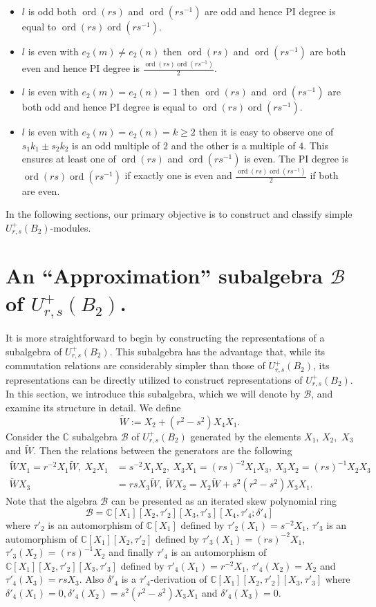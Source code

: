 \documentclass[12 pt,reqno]{amsart}
\numberwithin{equation}{section}
\newcommand{\C}{\mathbb{C}}
\newcommand{\B}{\mathcal{B}}
\DeclareMathOperator{\ord}{ord}
\theoremstyle{definition}
\theoremstyle{definition}
\theoremstyle{remark}
\theoremstyle{remark}
\begin{document}
    \begin{itemize}
        \item $l$ is odd both $\ord(rs)$ and $\ord(rs^{-1})$ are odd and hence PI degree is equal to $\ord(rs)\ord(rs^{-1})$.
        \item  $l$ is even with $e_2(m)\neq e_2(n)$ then $\ord(rs)$ and $\ord(rs^{-1})$ are both even and hence PI degree is $\displaystyle\frac{\ord(rs)\ord(rs^{-1})}{2}$.
        \item $l$ is even with $e_2(m)= e_2(n)=1$ then $\ord(rs)$ and $\ord(rs^{-1})$ are both odd and hence PI degree is equal to $\ord(rs)\ord(rs^{-1})$.
        \item $l$ is even with $e_2(m)= e_2(n)=k \geq 2$ then it is easy to observe one of $s_1k_1\pm s_2k_2$ is an odd multiple of $2$ and the other is a multiple of $4$. This ensures at least one of $\ord(rs)$ and $\ord(rs^{-1})$ is even. The PI degree is $\ord(rs)\ord(rs^{-1})$ if exactly one is even and $\displaystyle\frac{\ord(rs)\ord(rs^{-1})}{2}$ if both are even.
    \end{itemize}
In the following sections, our primary objective is to construct and classify simple $U_{r,s}^+(B_2)$-modules.
\section{\texorpdfstring{An \enquote{Approximation} subalgebra $\mathcal{B}$ of $U_{r,s}^+(B_2)$.}{} }
It is more straightforward to begin by constructing the representations of a subalgebra of $U_{r,s}^+(B_2)$. This subalgebra has the advantage that, while its commutation relations are considerably simpler than those of $U_{r,s}^+(B_2)$, its representations can be directly utilized to construct representations of $U_{r,s}^+(B_2)$. In this section, we introduce this subalgebra, which we will denote by $\mathcal{B}$, and examine its structure in detail. We define \begin{equation}\label{cen1}
    \tilde{W}:=X_2+(r^2-s^2)X_4X_1.
\end{equation} Consider the $\C$ subalgebra $\B$ of $U_{r,s}^+(B_2)$ generated by the elements $X_1$, $ X_2,$  $X_3$ and $\tilde{W}$. Then the relations between the generators are the following
\begin{align*}
    \tilde{W}X_1=r^{-2}X_1\tilde{W}, \ X_2X_1&=s^{-2}X_1X_2, \ X_3X_1=(rs)^{-2}X_1X_3, \  X_3X_2=(rs)^{-1}X_2X_3\\
    \tilde{W}X_3&=rsX_3\tilde{W}, \ \tilde{W}X_2=X_2\tilde{W}+s^2(r^2-s^2)X_3X_1.
\end{align*}
Note that the algebra $\B$ can be presented as an iterated skew polynomial ring 
\[\B=\C[X_1][X_2,\tau'_2][X_3,\tau'_3][X_4,\tau'_4;\delta'_4]\]
where $\tau'_2$ is an automorphism of $\C[X_1]$ defined by $\tau'_2(X_1)=s^{-2}X_1$, $\tau'_3$ is an automorphism of $\C[X_1][X_2,\tau'_2]$ defined by $\tau'_3(X_1)=(rs)^{-2}X_1$, $\tau'_3(X_2)=(rs)^{-1}X_2$ and finally $\tau'_4$ is an automorphism of $\C[X_1][X_2,\tau'_2][X_3,\tau'_3]$ defined by $\tau'_4(X_1)=r^{-2}X_1$, $\tau'_4(X_2)=X_2$ and $\tau'_4(X_3)=rsX_3$. Also $\delta'_4$ is a $\tau'_4$-derivation of $\C[X_1][X_2,\tau'_2][X_3,\tau'_3]$ where $\delta'_4(X_1)=0, \delta'_4(X_2)=s^2(r^2-s^2)X_3X_1$ and $\delta'_4(X_3)=0$.
\end{document}
